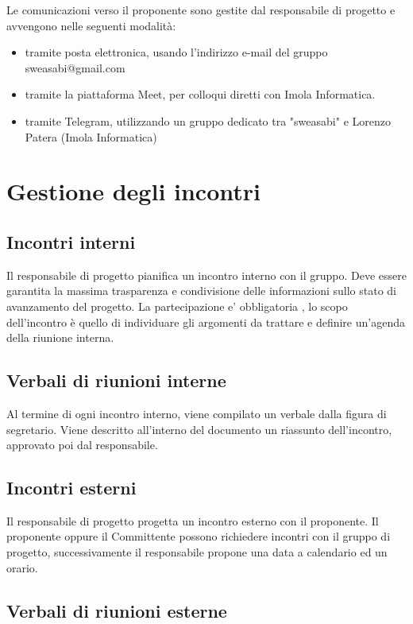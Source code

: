 Le comunicazioni verso il proponente sono gestite dal responsabile di progetto e avvengono nelle seguenti modalità:

\begin{itemize}
\item tramite posta elettronica, usando l'indirizzo e-mail del gruppo sweasabi@gmail.com
\item tramite la piattaforma Meet, per colloqui diretti con Imola Informatica.
\item tramite Telegram, utilizzando un gruppo dedicato tra "sweasabi" e Lorenzo Patera (Imola Informatica)
\end{itemize}

\section{Gestione degli incontri}

\subsection{Incontri interni}

Il responsabile di progetto pianifica un incontro interno con il gruppo. Deve essere garantita la massima trasparenza e condivisione delle informazioni sullo stato di avanzamento del progetto.
La partecipazione e' obbligatoria , lo scopo dell'incontro è quello di individuare gli argomenti da trattare e definire un'agenda della riunione interna.

\subsection{Verbali di riunioni interne}

Al termine di ogni incontro interno, viene compilato un verbale dalla figura di segretario. Viene descritto all'interno del documento un riassunto dell'incontro, approvato poi dal responsabile.

\subsection{Incontri esterni}

Il responsabile di progetto progetta un incontro esterno con il proponente. Il proponente oppure il Committente possono richiedere incontri con il gruppo di progetto, successivamente il responsabile propone una data a calendario ed un orario.

\subsection{Verbali di riunioni esterne}

